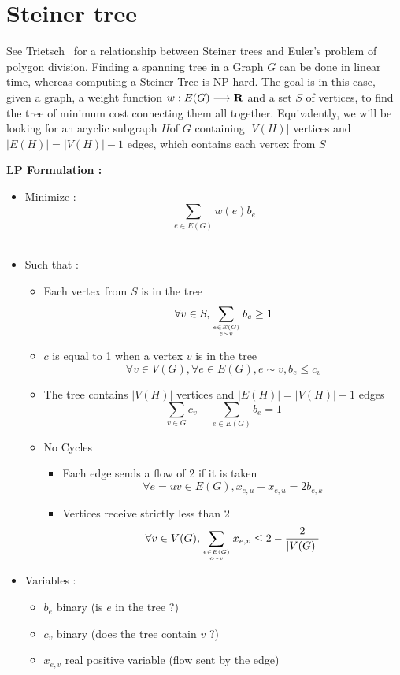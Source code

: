 \section{Steiner tree}

See Trietsch~\cite{Trietsch1984} for a relationship between Steiner
trees and Euler's problem of polygon division.
Finding  a spanning tree  in a Graph $G$ can be done in linear time, whereas computing a Steiner Tree is NP-hard. The goal is in this case, given a graph, a weight function $w:E(G) \longrightarrow \mathbf{R}$ and a set $S$ of vertices, to find the tree of minimum cost connecting them all together. Equivalently, we will be looking for an acyclic subgraph $H$of $G$ containing $|V(H)|$ vertices and $|E(H)|=|V(H)|-1$ edges, which contains each vertex from $S$

{\bf LP Formulation :}
\begin{itemize}
\item Minimize : $$\sum_{e\in E(G)}w(e) b_e$$\\
\item Such that :
  \begin{itemize}
  \item Each vertex from $S$ is in the tree
    $$\forall v \in S, \sum_{e\in E(G)\atop e\sim v}b_e \geq 1$$
  \item $c$ is equal to 1 when a vertex $v$ is in the tree
    $$\forall v \in V(G), \forall e\in E(G), e\sim v, b_e\leq c_v$$
  \item The tree contains $|V(H)|$ vertices and $|E(H)|=|V(H)|-1$ edges
    $$\sum_{v\in G}c_v - \sum_{e\in E(G)}b_e = 1$$
  \item No Cycles
    \begin{itemize}
    \item Each edge sends a flow of 2 if it is taken
      $$\forall e=uv\in E(G), x_{e,u} + x_{e,u} = 2b_{e,k}$$
    \item Vertices receive strictly less than 2
      $$\forall v\in V(G), \sum_{e\in E(G)\atop e\sim v}x_{e,v}\leq 2-\frac 2 {|V(G)|}$$
    \end{itemize}

  \end{itemize}
\item Variables :
  \begin{itemize}
  \item $b_e$  binary (is $e$ in the tree ?)
  \item $c_v$ binary (does the tree contain $v$ ?)
  \item $x_{e,v}$ real positive variable (flow sent by the edge)
  \end{itemize}
\end{itemize}


